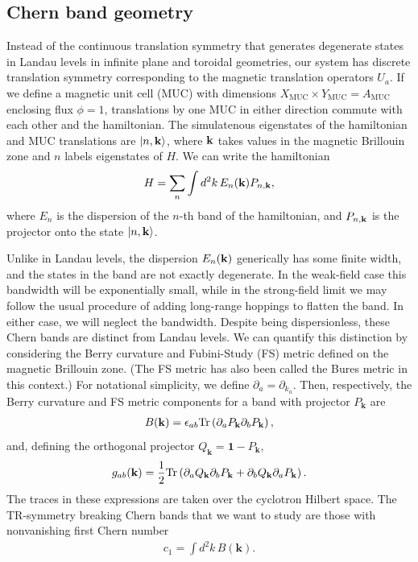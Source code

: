 \documentclass[aps,prb,twocolumn,letterpaper,twoside,nobalancelastpage,groupedaddress,amsmath,amssymb,floatfix,citeautoscript]{revtex4-1}
\begin{document}
\subsection{Chern band geometry}
Instead of the continuous translation symmetry that generates degenerate states in Landau levels in infinite plane and toroidal geometries, our system has discrete translation symmetry corresponding to the magnetic translation operators $U_a$. If we define a magnetic unit cell (MUC) with dimensions $X_{\text{MUC}} \times Y_{\text{MUC}} = A_{\text{MUC}}$ enclosing flux $\phi=1$, translations by one MUC in either direction commute with each other and the hamiltonian. The simulatenous eigenstates of the hamiltonian and MUC translations are $\ket{n,{\bf k}}$, where ${\bf k}$ takes values in the magnetic Brillouin zone and $n$ labels eigenstates of $H$. We can write the hamiltonian 
\begin{align}
\label{band-projector-ham}
H = \sum_{n}\int d^2k\, E_{n}({\bf k}) P_{n,{\bf k}},
\end{align}
where $E_n$ is the dispersion of the $n$-th band of the hamiltonian, and $P_{n,{\bf k}}$ is the projector onto the state $\ket{n,{\bf k}}$.

Unlike in Landau levels, the dispersion $E_{n}({\bf k})$ generically has some finite width, and the states in the band are not exactly degenerate. In the weak-field case this bandwidth will be exponentially small\cite{Harper:2014vi}, while in the strong-field limit we may follow the usual procedure of adding long-range hoppings to flatten the band. \cite{Bergholtz:2013ue,parameswaran_fractional_2013} In either case, we will neglect the bandwidth. Despite being dispersionless, these Chern bands are distinct from Landau levels. We can quantify this distinction by considering the Berry curvature and Fubini-Study (FS) metric defined on the magnetic Brillouin zone\cite{parameswaran_fractional_2013,roy_band_2014,Claassen2015}. (The FS metric has also been called the Bures metric in this context.\cite{palumbo_momentum-space_2017}) For notational simplicity, we define $\partial_a = \partial_{k_a}$. Then, respectively, the Berry curvature and FS metric components for a band with projector $P_{\mathbf{k}}$ are
\begin{align*}
B({\bf k}) = \epsilon_{ab}\text{Tr}\left(\partial_{a}P_{\mathbf{k}}\partial_b P_{\mathbf{k}}\right),
\end{align*}
and, defining the orthogonal projector $Q_{\mathbf{k}} = \mathbf{1} - P_{\mathbf{k}}$,
\begin{align*}
g_{ab}({\bf k}) = \frac{1}{2}\text{Tr}\left(\partial_{a}Q_{\mathbf{k}}\partial_{b}P_{\mathbf{k}} + \partial_{b}Q_{\mathbf{k}}\partial_{a} P_{\mathbf{k}}\right). \\
\end{align*}
The traces in these expressions are taken over the cyclotron Hilbert space. The TR-symmetry breaking Chern bands that we want to study are those with nonvanishing first Chern number 
\begin{align*}
c_1 = \int d^2k\, B(\mathbf{k}).
\end{align*}
\end{document}
